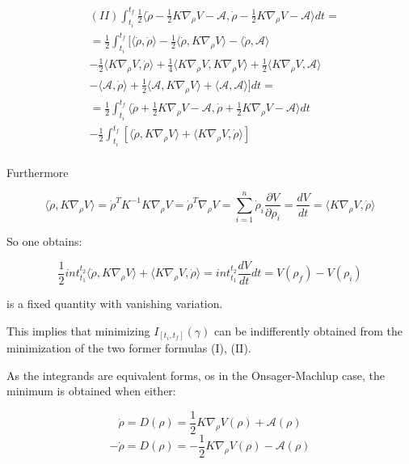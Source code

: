 \documentclass{article}
\begin{document}
\begin{align*}
&(II) \int_{t_i}^{t_f} \frac{1}{2} \langle \dot{\rho} -\frac{1}{2} K \nabla_{\rho} V - \mathcal{A} , \dot{\rho} - \frac{1}{2} K \nabla_{\rho} V - \mathcal{A} \rangle dt = \\
& =  \frac{1}{2} \int_{t_i}^{t_f} \Big [ \langle  \dot{\rho},  \dot{\rho} \rangle -  \frac{1}{2}  \langle \dot{\rho},  K \nabla_{\rho} V \rangle -  \langle  \dot{\rho},\mathcal{A} \rangle  \\
& -  \frac{1}{2} \langle K \nabla_{\rho} V , \dot{\rho} \rangle + \frac{1}{4} \langle K \nabla_{\rho} V , K \nabla_{\rho} V \rangle +  \frac{1}{2} \langle K \nabla_{\rho} V ,\mathcal{A} \rangle  \\
& - \langle \mathcal{A}, \dot{\rho} \rangle + \frac{1}{2}  \langle \mathcal{A},  K \nabla_{\rho} V \rangle +  \langle \mathcal{A}, \mathcal{A} \rangle \Big] dt = \\ 
& =  \frac{1}{2} \int_{t_i}^{t_f} \langle \dot{\rho} +  \frac{1}{2}  K \nabla_{\rho} V -\mathcal{A},  \dot{\rho} +  \frac{1}{2}  K \nabla_{\rho} V -\mathcal{A}  \rangle dt \\
& -  \frac{1}{2} \int_{t_i}^{t_f} [\langle \dot{\rho} , K \nabla_{\rho} V \rangle + \langle K \nabla_{\rho} V,\dot{\rho}\rangle] \\
\end{align*}

Furthermore

$$ \langle \dot{\rho}, K \nabla_{\rho} V \rangle = \dot{\rho}^T K^{-1} K  \nabla_{\rho} V = \dot{\rho}^T  \nabla_{\rho} V = \sum_{i=1}^{n} \dot{\rho}_i \frac{\partial V}{\partial \rho_i} = \frac{d V}{d t} = \langle K \nabla_{\rho} V ,\dot{\rho} \rangle $$

So one obtains:

$$ \frac{1}{2} int_{t_1}^{t_2} \langle \dot{\rho},K \nabla_{\rho} V \rangle + \langle K \nabla_{\rho} V , \dot{\rho} \rangle =  int_{t_1}^{t_2} \frac{dV}{dt} dt = V(\rho_f) - V(\rho_i)$$

is a fixed quantity with vanishing variation.

This implies that minimizing $I_{[t_i,t_f]}(\gamma)$ can be indifferently obtained from the minimization of the two former formulas (I), (II).

As the integrands are equivalent forms, os in the Onsager-Machlup case, the minimum is obtained when either:

$$\dot{\rho} = D(\rho) = \frac{1}{2} K \nabla_{\rho} V(\rho) + \mathcal{A}(\rho)$$
$$- \dot{\rho} = D(\rho) = - \frac{1}{2} K \nabla_{\rho} V(\rho) - \mathcal{A}(\rho)$$
\end{document}
